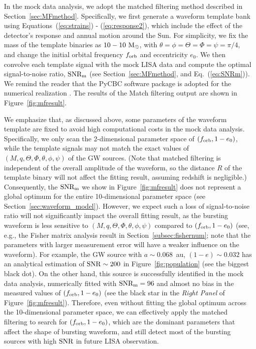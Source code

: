 \documentclass[%
 reprint,
 amsmath,amssymb,
 aps,
]{revtex4-2}
\begin{document}
In the mock data analysis, we adopt the matched filtering method described in Section~\ref{sec:MFmethod}. Specifically, we first generate a waveform template bank using Equations~(\ref{eq:strains}) - (\ref{eq:response2}), which include the effect of the detector's response and annual motion around the Sun. For simplicity, we fix the mass of the template binaries as $10 - 10~{\rm M_{\odot}}$, with $\theta=\phi=\Theta=\Phi=\psi=\pi/4$, and change the initial orbital frequency $f_{\rm orb}$ and eccentricity $e_0$. We then convolve each template signal with the mock LISA data and compute the optimal signal-to-noise ratio, $\rm SNR_m$ (see Section~\ref{sec:MFmethod}, and Eq.~(\ref{eq:SNRm})). We remind the reader that the PyCBC software package is adopted for the numerical realization \citep{PYCBC_alex_nitz_2024_10473621}. The results of the Match filtering output are shown in Figure~\ref{fig:mfresult}.

We emphasize that, as discussed above, some parameters of the waveform template are fixed to avoid high computational costs in the mock data analysis. Specifically, we only scan the 2-dimensional parameter space of $(f_{\rm orb}, 1-e_0)$, while the template signals may not match the exact values of $(M,q,\Theta,\Phi,\theta,\phi,\psi)$ of the GW sources. (Note that matched filtering is independent of the overall amplitude of the waveform, so the distance $R$ of the template binary will not affect the fitting result, assuming redshift is negligible.) Consequently, the $\rm SNR_m$ we show in Figure~\ref{fig:mfresult} does not represent a global optimum for the entire 10-dimensional parameter space (see Section~\ref{sec:waveform_model}). However, we expect such a loss of signal-to-noise ratio will not significantly impact the overall fitting result, as the bursting waveform is less sensitive to $(M,q,\Theta,\Phi,\theta,\phi,\psi)$ compared to $(f_{\rm orb}, 1-e_0)$ (see, e.g., the Fisher matrix analysis result in Section~\ref{subsec:fishernum}; note that the parameters with larger measurement error will have a weaker influence on the waveform). For example, the GW source with $a\sim 0.068$~au, $(1-e)\sim 0.032$ has an analytical estimation of $\rm SNR\sim 200$ in Figure~\ref{fig:population} (see the biggest black dot). On the other hand, this source is successfully identified in the mock data analysis, numerically fitted with $\rm SNR_m=96$ and almost no bias in the measured values of $(f_{\rm orb}, 1-e_0)$ (see the black star in the {\it Right Panel} of Figure~\ref{fig:mfresult}). Therefore, even without fitting the global optimum across the 10-dimensional parameter space, we can effectively apply the matched filtering to search for $(f_{\rm orb},1-e_0)$, which are the dominant parameters that affect the shape of bursting waveform, and still detect most of the bursting sources with high $\rm SNR$ in future LISA observation.
\end{document}
